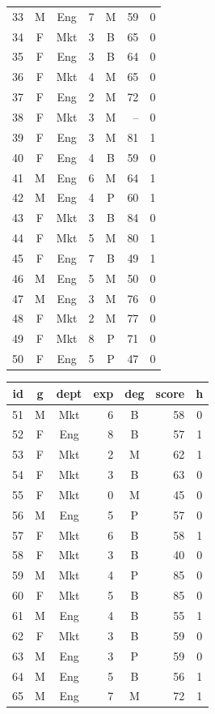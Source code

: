 \documentclass[11pt,a4paper]{article}
\begin{document}
\begin{center}
\begin{tabular}[t]{@{}r c c r c r c@{}}
33 & M & Eng & 7 & M & 59 & 0 \\
34 & F & Mkt & 3 & B & 65 & 0 \\
35 & F & Eng & 3 & B & 64 & 0 \\
36 & F & Mkt & 4 & M & 65 & 0 \\
37 & F & Eng & 2 & M & 72 & 0 \\
38 & F & Mkt & 3 & M & -- & 0 \\
39 & F & Eng & 3 & M & 81 & 1 \\
40 & F & Eng & 4 & B & 59 & 0 \\
41 & M & Eng & 6 & M & 64 & 1 \\
42 & M & Eng & 4 & P & 60 & 1 \\
43 & F & Mkt & 3 & B & 84 & 0 \\
44 & F & Mkt & 5 & M & 80 & 1 \\
45 & F & Eng & 7 & B & 49 & 1 \\
46 & M & Eng & 5 & M & 50 & 0 \\
47 & M & Eng & 3 & M & 76 & 0 \\
48 & F & Mkt & 2 & M & 77 & 0 \\
49 & F & Mkt & 8 & P & 71 & 0 \\
50 & F & Eng & 5 & P & 47 & 0 \\
\bottomrule
\end{tabular}
\hfill
\begin{tabular}[t]{@{}r c c r c r c@{}}
\toprule
id & g & dept & exp & deg & score & h \\
\midrule
51 & M & Mkt & 6 & B & 58 & 0 \\
52 & F & Eng & 8 & B & 57 & 1 \\
53 & F & Mkt & 2 & M & 62 & 1 \\
54 & F & Mkt & 3 & B & 63 & 0 \\
55 & F & Mkt & 0 & M & 45 & 0 \\
56 & M & Eng & 5 & P & 57 & 0 \\
57 & F & Mkt & 6 & B & 58 & 1 \\
58 & F & Mkt & 3 & B & 40 & 0 \\
59 & M & Mkt & 4 & P & 85 & 0 \\
60 & F & Mkt & 5 & B & 85 & 0 \\
61 & M & Eng & 4 & B & 55 & 1 \\
62 & F & Mkt & 3 & B & 59 & 0 \\
63 & M & Eng & 3 & P & 59 & 0 \\
64 & M & Eng & 5 & B & 56 & 1 \\
65 & M & Eng & 7 & M & 72 & 1 \\

\end{tabular}
\end{center}
\end{document}
